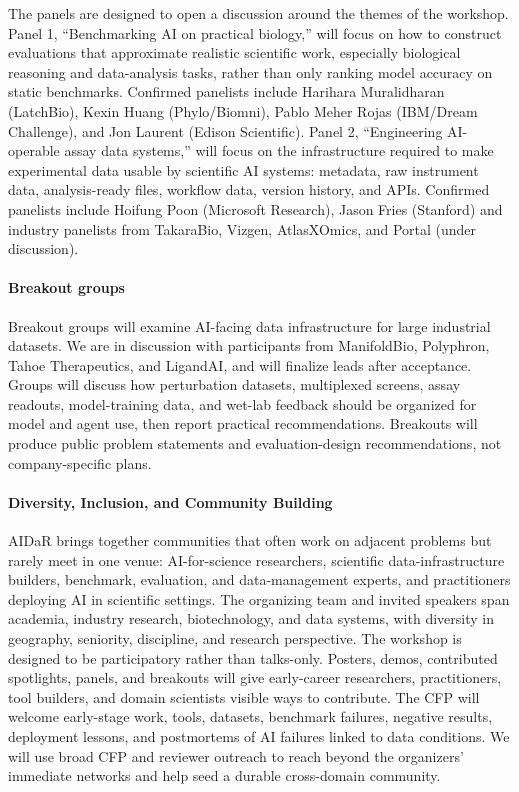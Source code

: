 \documentclass[10pt]{article}
\begin{document}
The panels are designed to open a discussion around the themes of the workshop. Panel 1, ``Benchmarking AI on practical biology,'' will focus on how to construct evaluations that approximate realistic scientific work, especially biological reasoning and data-analysis tasks, rather than only ranking model accuracy on static benchmarks. Confirmed panelists include Harihara Muralidharan (LatchBio), Kexin Huang (Phylo/Biomni), Pablo Meher Rojas (IBM/Dream Challenge), and Jon Laurent (Edison Scientific). Panel 2, ``Engineering AI-operable assay data systems,'' will focus on the infrastructure required to make experimental data usable by scientific AI systems: metadata, raw instrument data, analysis-ready files, workflow data, version history, and APIs. Confirmed panelists include Hoifung Poon (Microsoft Research), Jason Fries (Stanford) and industry panelists from TakaraBio, Vizgen, AtlasXOmics, and Portal (under discussion). 

\paragraph{Breakout groups}
\label{sec:breakouts}
Breakout groups will examine AI-facing data infrastructure for large industrial datasets. We are in discussion with participants from ManifoldBio, Polyphron, Tahoe Therapeutics, and LigandAI, and will finalize leads after acceptance. Groups will discuss how perturbation datasets, multiplexed screens, assay readouts, model-training data, and wet-lab feedback should be organized for model and agent use, then report practical recommendations. Breakouts will produce public problem statements and evaluation-design recommendations, not company-specific plans.


\paragraph{Diversity, Inclusion, and Community Building}
\label{sec:diversity}

AIDaR brings together communities that often work on adjacent problems but rarely meet in one venue: AI-for-science researchers, scientific data-infrastructure builders, benchmark, evaluation, and data-management experts, and practitioners deploying AI in scientific settings. The organizing team and invited speakers span academia, industry research, biotechnology, and data systems, with diversity in geography, seniority, discipline, and research perspective. The workshop is designed to be participatory rather than talks-only. Posters, demos, contributed spotlights, panels, and breakouts will give early-career researchers, practitioners, tool builders, and domain scientists visible ways to contribute. The CFP will welcome early-stage work, tools, datasets, benchmark failures, negative results, deployment lessons, and postmortems of AI failures linked to data conditions. We will use broad CFP and reviewer outreach to reach beyond the organizers' immediate networks and help seed a durable cross-domain community.
\end{document}
